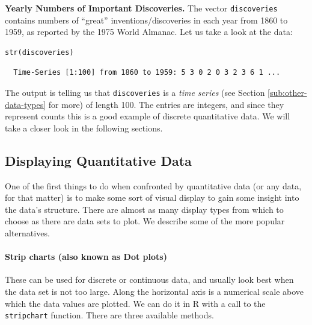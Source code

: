 \documentclass[captions=tableheading]{scrbook}
\begin{document}
\begin{example}
\textbf{Yearly Numbers of Important Discoveries.} The vector \texttt{discoveries} contains numbers of “great” inventions/discoveries in each year from 1860 to 1959, as reported by the 1975 World Almanac. Let us take a look at the data:


\begin{verbatim}
str(discoveries)
\end{verbatim}

\begin{verbatim}
  Time-Series [1:100] from 1860 to 1959: 5 3 0 2 0 3 2 3 6 1 ...
\end{verbatim}

\end{example}

The output is telling us that \texttt{discoveries} is a \emph{time series} (see Section \ref{sub:other-data-types} for more) of length 100. The entries are integers, and since they represent counts this is a good example of discrete quantitative data. We will take a closer look in the following sections.
\subsection{Displaying Quantitative Data}
\label{sec-3-1-2}

\label{sub:Displaying-Quantitative-Data}

One of the first things to do when confronted by quantitative data (or any data, for that matter) is to make some sort of visual display to gain some insight into the data's structure. There are almost as many display types from which to choose as there are data sets to plot. We describe some of the more popular alternatives. 

\paragraph*{Strip charts (also known as Dot plots)}
\label{par:Strip-charts}

These can be used for discrete or continuous data, and usually look best when the data set is not too large. Along the horizontal axis is a numerical scale above which the data values are plotted. We can do it in \textsf{R} with a call to the \texttt{stripchart} function. There are three available methods.
\end{document}
